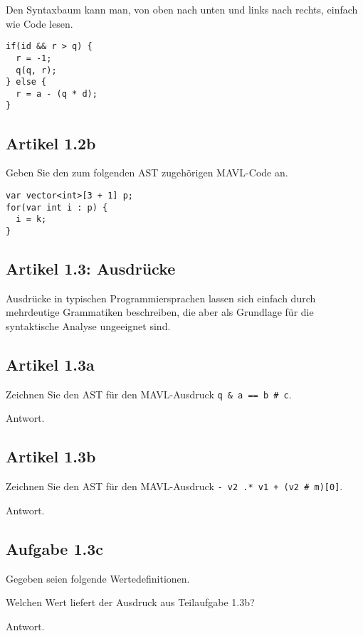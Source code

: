 \documentclass[
  ngerman,
  DIV=14
]{scrartcl}
\begin{document}
\bigskip\noindent
Den Syntaxbaum kann man, von oben nach unten und links nach rechts, einfach wie Code lesen.
\begin{lstlisting}
if(id && r > q) {
  r = -1;
  q(q, r);
} else {
  r = a - (q * d);
}
\end{lstlisting}


\subsection*{Artikel 1.2b}
Geben Sie den zum folgenden AST zugehörigen MAVL-Code an.  

\bigskip\noindent
\begin{lstlisting}
var vector<int>[3 + 1] p;
for(var int i : p) {
  i = k;
}  
\end{lstlisting}


\subsection*{Artikel 1.3: Ausdrücke}
Ausdrücke in typischen Programmiersprachen lassen sich einfach durch mehrdeutige Grammatiken beschreiben, die aber als Grundlage für die syntaktische Analyse ungeeignet sind.

\subsection*{Artikel 1.3a}
Zeichnen Sie den AST für den MAVL-Ausdruck \texttt{q \& a == b \# c}.


\bigskip\noindent
Antwort.

\subsection*{Artikel 1.3b}
Zeichnen Sie den AST für den MAVL-Ausdruck \texttt{- v2 .* v1 + (v2 \# m)[0]}.


\bigskip\noindent
Antwort.

\subsection*{Aufgabe 1.3c}
Gegeben seien folgende Wertedefinitionen.

Welchen Wert liefert der Ausdruck aus Teilaufgabe 1.3b?

\bigskip\noindent
Antwort.
\end{document}
